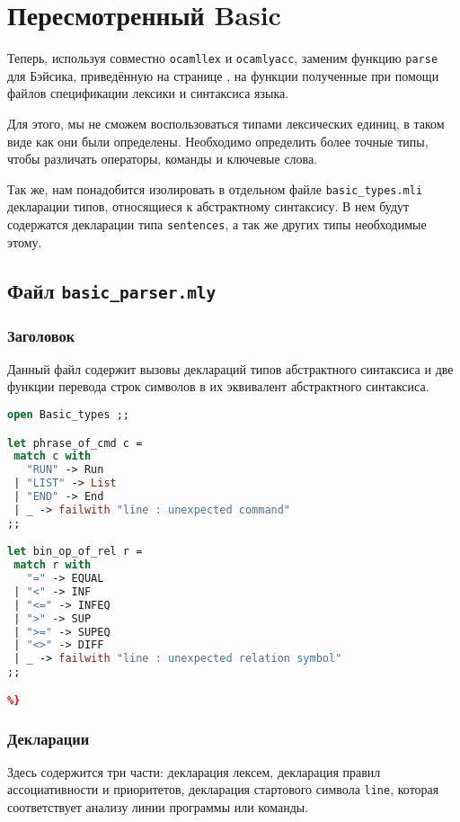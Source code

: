 \section{Пересмотренный Basic}

Теперь, используя совместно \texttt{ocamllex} и \texttt{ocamlyacc}, заменим
функцию \texttt{parse} для Бэйсика, приведённую на странице \pageref{??}, на
функции полученные при помощи файлов спецификации лексики и синтаксиса языка.

Для этого, мы не сможем воспользоваться типами лексических единиц, в таком виде
как они были определены. Необходимо определить более точные типы, чтобы
различать операторы, команды и ключевые слова.

Так же, нам понадобится изолировать в отдельном файле \texttt{basic\_types.mli}
декларации типов, относящиеся к абстрактному синтаксису. В нем будут содержатся
декларации типа \texttt{sentences}, а так же других типы необходимые этому.

\subsection{Файл \texttt{basic\_parser.mly}}

\subsubsection{Заголовок}

Данный файл содержит вызовы деклараций типов абстрактного синтаксиса и две
функции перевода строк символов в их эквивалент абстрактного синтаксиса.

\begin{lstlisting}[language=Caml]
%{
open Basic_types ;;

let phrase_of_cmd c =
 match c with
   "RUN" -> Run
 | "LIST" -> List
 | "END" -> End
 | _ -> failwith "line : unexpected command"
;;

let bin_op_of_rel r =
 match r with
   "=" -> EQUAL
 | "<" -> INF
 | "<=" -> INFEQ
 | ">" -> SUP
 | ">=" -> SUPEQ
 | "<>" -> DIFF
 | _ -> failwith "line : unexpected relation symbol"
;;

%}
\end{lstlisting}

\subsubsection{Декларации}

Здесь содержится три части: декларация лексем, декларация правил ассоциативности
и приоритетов, декларация стартового символа \texttt{line}, которая
соответствует анализу линии программы или команды.


